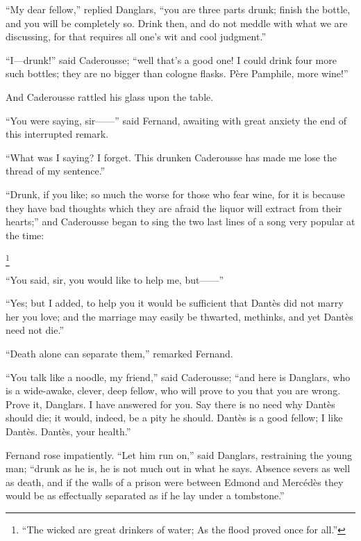 “My dear fellow,” replied Danglars, “you are three parts drunk; finish
the bottle, and you will be completely so. Drink then, and do not
meddle with what we are discussing, for that requires all one’s wit and
cool judgment.”

“I—drunk!” said Caderousse; “well that’s a good one! I could drink four
more such bottles; they are no bigger than cologne flasks. Père
Pamphile, more wine!”

And Caderousse rattled his glass upon the table.

“You were saying, sir——” said Fernand, awaiting with great anxiety the
end of this interrupted remark.

“What was I saying? I forget. This drunken Caderousse has made me lose
the thread of my sentence.”

“Drunk, if you like; so much the worse for those who fear wine, for it
is because they have bad thoughts which they are afraid the liquor will
extract from their hearts;” and Caderousse began to sing the two last
lines of a song very popular at the time:

\footnote[1]{“The wicked
are great drinkers of water; As the flood proved once for all.” }

“You said, sir, you would like to help me, but——”

“Yes; but I added, to help you it would be sufficient that Dantès did
not marry her you love; and the marriage may easily be thwarted,
methinks, and yet Dantès need not die.”

“Death alone can separate them,” remarked Fernand.

“You talk like a noodle, my friend,” said Caderousse; “and here is
Danglars, who is a wide-awake, clever, deep fellow, who will prove to
you that you are wrong. Prove it, Danglars. I have answered for you.
Say there is no need why Dantès should die; it would, indeed, be a pity
he should. Dantès is a good fellow; I like Dantès. Dantès, your
health.”

Fernand rose impatiently. “Let him run on,” said Danglars, restraining
the young man; “drunk as he is, he is not much out in what he says.
Absence severs as well as death, and if the walls of a prison were
between Edmond and Mercédès they would be as effectually separated as
if he lay under a tombstone.”

